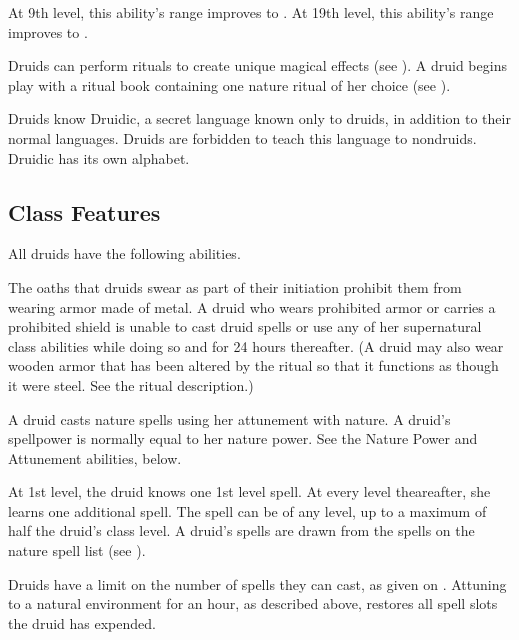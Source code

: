 At 9th level, this ability's range improves to \rngclose.
At 19th level, this ability's range improves to \rngmed.

Druids can perform rituals to create unique magical effects (see ).
A druid begins play with a ritual book containing one nature ritual of her choice (see ).

Druids know Druidic, a secret language known only to druids, in addition to their normal languages.
Druids are forbidden to teach this language to nondruids.
Druidic has its own alphabet.

\subsection{Class Features}
All druids have the following abilities.

The oaths that druids swear as part of their initiation prohibit them from wearing armor made of metal.
A druid who wears prohibited armor or carries a prohibited shield is unable to cast druid spells or use any of her supernatural class abilities while doing so and for 24 hours thereafter.
(A druid may also wear wooden armor that has been altered by the  ritual so that it functions as though it were steel. See the ritual description.)

A druid casts nature spells using her attunement with nature.
A druid's spellpower is normally equal to her nature power.
See the Nature Power and Attunement abilities, below.

At 1st level, the druid knows one 1st level spell.
At every level theareafter, she learns one additional spell.
The spell can be of any level, up to a maximum of half the druid's class level.
A druid's spells are drawn from the spells on the nature spell list (see ).

Druids have a limit on the number of spells they can cast, as given on .
Attuning to a natural environment for an hour, as described above, restores all spell slots the druid has expended.

